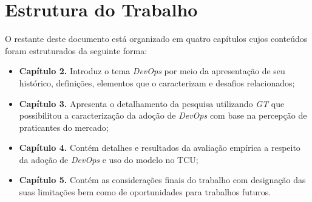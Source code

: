 \section{Estrutura do Trabalho}

O restante deste documento está organizado em quatro capítulos cujos conteúdos
foram estruturados da seguinte forma:

\begin{itemize}
\item \textbf{Capítulo 2.} Introduz o tema \textit{DevOps} por meio da
apresentação de seu histórico, definições, elementos que o caracterizam e
desafios relacionados;
\item \textbf{Capítulo 3.} Apresenta o detalhamento da pesquisa utilizando
\textit{\acrfull{GT}} que possibilitou a caracterização da adoção de
\textit{DevOps} com base na percepção de praticantes do mercado;
\item \textbf{Capítulo 4.} Contém detalhes e resultados da avaliação empírica
a respeito da adoção de {\it DevOps} e uso do modelo no \acrshort{TCU};
\item \textbf{Capítulo 5.} Contém as considerações finais do trabalho com
designação das suas limitações bem como de oportunidades para trabalhos futuros.
\end{itemize}




